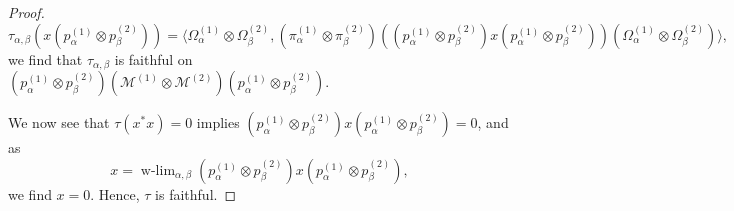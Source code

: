 \documentclass[sn-mathphys-num]{sn-jnl}%
\newcommand{\MM}{\mathcal{M}}
\numberwithin{equation}{section}
\theoremstyle{thmstyleone}%
\theoremstyle{thmstyletwo}%
\theoremstyle{thmstylethree}%
\begin{document}
\begin{proof}
    \begin{equation}
        \tau_{\alpha,\beta}(x(p_\alpha^{(1)}\otimes p_\beta^{(2)}))=\langle \Omega_\alpha^{(1)}\otimes \Omega_\beta^{(2)},(\pi_\alpha^{(1)}\otimes \pi_\beta^{(2)})((p_\alpha^{(1)}\otimes p_\beta^{(2)})x(p_\alpha^{(1)}\otimes p_\beta^{(2)})) (\Omega_\alpha^{(1)}\otimes \Omega_\beta^{(2)})\rangle,
    \end{equation}
    we find that $\tau_{\alpha,\beta}$ is faithful on $(p_\alpha^{(1)}\otimes p_\beta^{(2)})(\MM^{(1)}\otimes \MM^{(2)})(p_\alpha^{(1)}\otimes p_\beta^{(2)})$.

    We now see that $\tau(x^*x)=0$ implies $(p_\alpha^{(1)}\otimes p_\beta^{(2)})x(p_\alpha^{(1)}\otimes p_\beta^{(2)})=0$, and as 
    \begin{equation}
        x=\operatorname{w-lim}_{\alpha,\beta}(p_\alpha^{(1)}\otimes p_\beta^{(2)})x(p_\alpha^{(1)}\otimes p_\beta^{(2)}),
    \end{equation}
    we find $x=0$. Hence, $\tau$ is faithful.
\end{proof}
\end{document}
